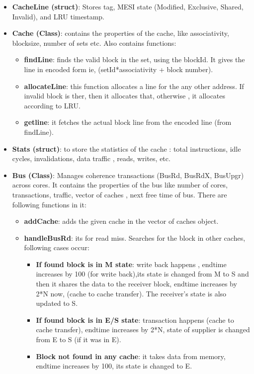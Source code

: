 \documentclass{article}
\begin{document}
\begin{itemize}
    \item \textbf{CacheLine (struct)}: Stores tag, MESI state (Modified, Exclusive, Shared, Invalid), and LRU timestamp.
    \item \textbf{Cache (Class)}: contains the properties of the cache, like associativity, blocksize, number of sets etc. Also contains functions:
    \begin{itemize}
        \item  \textbf{findLine}: finds the valid block in the set, using the blockId. It gives the line in encoded form ie, (setId*associativity + block number).
        \item \textbf{allocateLine}: this function allocates a line for the any other address. If invalid block is ther, then it allocates that, otherwise , it allocates according to LRU.
        \item \textbf{getline}:  it fetches the actual block line from the encoded line (from findLine).
    \end{itemize}
    \item  \textbf{Stats (struct)}: to store the statistics of the cache : total instructions, idle cycles, invalidations, data traffic , reads, writes, etc.
    \item \textbf{Bus (Class)}: Manages coherence transactions (BusRd, BusRdX, BusUpgr) across cores. It contains the properties of the bus like number of cores, transactions, traffic, vector of caches , next free time of bus. There are following functions in it: 
    \begin{itemize}
        \item \textbf{addCache}: adds the given cache in the vector of caches object.
        \item \textbf{handleBusRd}: its for read miss. Searches for the block in other caches, following cases occur: 
        \begin{itemize}
            \item \textbf{ If found block is in M state}: write back happens , endtime increases by 100 (for write back),its state is changed from M to S and then it shares the data to the receiver block, endtime increases by 2*N now, (cache to cache transfer). The receiver's state is also updated to S.
            \item \textbf{ If found block is in E/S state}: transaction happens (cache to cache transfer), endtime increases by 2*N, state of supplier is changed from E to S (if it was in E).
            \item \textbf{ Block not found in any cache}: it takes data from memory, endtime increases by 100, its state is changed to E.

\end{itemize}
\end{itemize}
\end{itemize}
\end{document}
